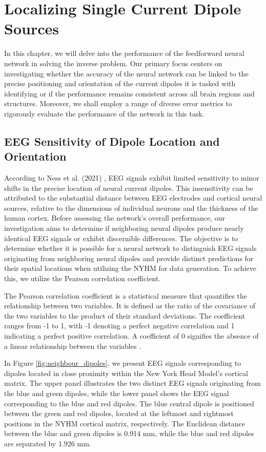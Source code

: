 \documentclass[a4paper, UKenglish, 11pt]{uiomaster}
\begin{document}
\chapter{Localizing Single Current Dipole Sources}
In this chapter, we will delve into the performance of the feedforward neural network in solving the inverse problem. Our primary focus centers on investigating whether the accuracy of the neural network can be linked to the precise positioning and orientation of the current dipoles it is tasked with identifying or if the performance remains consistent across all brain regions and structures. Moreover, we shall employ a range of diverse error metrics to rigorously evaluate the performance of the network in this task.


\section{EEG Sensitivity of Dipole Location and Orientation}
According to Ness et al. (2021) \cite{naess2021biophysically}, EEG signals exhibit limited sensitivity to minor shifts in the precise location of neural current dipoles. This insensitivity can be attributed to the substantial distance between EEG electrodes and cortical neural sources, relative to the dimensions of individual neurons and the thickness of the human cortex. Before assessing the network's overall performance, our investigation aims to determine if neighboring neural dipoles produce nearly identical EEG signals or exhibit discernible differences. The objective is to determine whether it is possible for a neural network to distinguish EEG signals originating from neighboring neural dipoles and provide distinct predictions for their spatial locations when utilizing the NYHM for data generation. To achieve this, we utilize the Pearson correlation coefficient.

The Pearson correlation coefficient is a statistical measure that quantifies the relationship between two variables. It is defined as the ratio of the covariance of the two variables to the product of their standard deviations. The coefficient ranges from -1 to 1, with -1 denoting a perfect negative correlation and 1 indicating a perfect positive correlation. A coefficient of 0 signifies the absence of a linear relationship between the variables \cite{numpy-docs}.

In Figure \ref{fig:neighbour_dipoles}, we present EEG signals corresponding to dipoles located in close proximity within the New York Head Model's cortical matrix. The upper panel illustrates the two distinct EEG signals originating from the blue and green dipoles, while the lower panel shows the EEG signal corresponding to the blue and red dipoles. The blue central dipole is positioned between the green and red dipoles, located at the leftmost and rightmost positions in the NYHM cortical matrix, respectively. The Euclidean distance between the blue and green dipoles is 0.914 mm, while the blue and red dipoles are separated by 1.926 mm.
\end{document}
